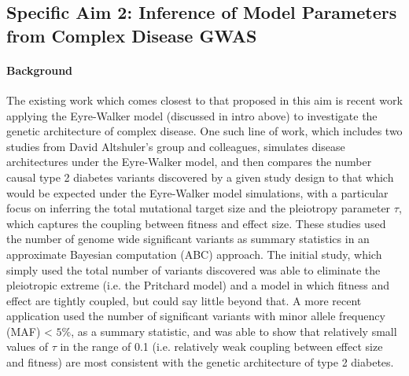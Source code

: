 \documentclass[11pt]{article}
\begin{document}


\subsection*{Specific Aim 2: Inference of Model Parameters from Complex Disease GWAS}

\paragraph{Background}

The existing work which comes closest to that proposed in this aim is recent work applying the Eyre-Walker model (discussed in intro above) to investigate the genetic architecture of complex disease. One such line of work, which includes two studies from David Altshuler's group and colleagues, simulates disease architectures under the Eyre-Walker model, and then compares the number causal type 2 diabetes variants discovered by a given study design to that which would be expected under the Eyre-Walker model simulations, with a particular focus on inferring the total mutational target size and the pleiotropy parameter $\tau$, which captures the coupling between fitness and effect size. These studies used the number of genome wide significant variants \cite{Agarwala:2013bu,Fuchsberger:2016df} as summary statistics in an approximate Bayesian computation (ABC) approach. The initial study\cite{Agarwala:2013bu}, which simply used the total number of variants discovered was able to eliminate the pleiotropic extreme (i.e. the Pritchard model) and a model in which fitness and effect are tightly coupled, but could say little beyond that. A more recent application\cite{Fuchsberger:2016df} used the number of significant variants with minor allele frequency (MAF) < $5\%$, as a summary statistic, and was able to show that relatively small values of $\tau$ in the range of 0.1 (i.e. relatively weak coupling between effect size and fitness) are most consistent with the genetic architecture of type 2 diabetes.
\end{document}
